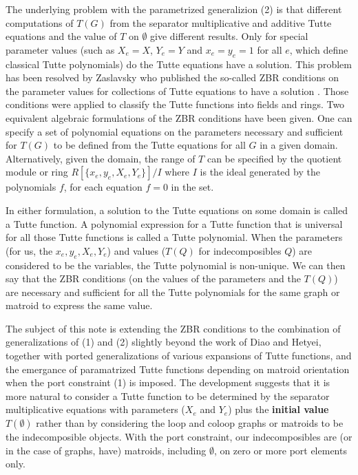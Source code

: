 \documentclass[12pt,leqno]{amsart}
\theoremstyle{remark}
\begin{document}
The underlying problem with the parametrized generalizion (2)
is that different computations of $T(G)$ from the separator
multiplicative and additive Tutte equations and the value of $T$ on $\emptyset$
give different results.  Only for special
parameter values (such as $X_e = X$, $Y_e = Y$ and $x_e = y_e = 1$
for all $e$,
which define classical Tutte polynomials) do the Tutte equations have a
solution.  
This problem has been resolved by Zaslavsky 
who published the so-called ZBR conditions\cite{Ellis-Monaghan-Traldi} 
on the parameter values for collections of Tutte equations to
have a solution 
\cite{MR93a:05047,Ellis-Monaghan-Traldi}.
Those conditions were applied to classify the Tutte functions into
fields\cite{MR93a:05047} and rings\cite{BollobasRiordanTuttePolyColored}.
Two equivalent algebraic formulations 
of the ZBR conditions have been given.  One can specify a set of 
polynomial equations on the 
parameters necessary and sufficient for $T(G)$ to be defined from
the Tutte equations for all $G$ in a given domain.  Alternatively, given the
domain, the range of
$T$ can be specified by the quotient module or ring 
$R[\{x_e, y_e, X_e, Y_e\}]/I$ 
where
$I$ is the ideal generated by the polynomials $f$, for each equation
$f = 0$ in the set.  

In either formulation, a solution to the Tutte equations on some domain
is called a Tutte function.  A polynomial expression for a Tutte function
that is universal for all those Tutte functions is called a Tutte polynomial.
When the parameters (for us, the $x_e, y_e, X_e, Y_e$) and
values ($T(Q)$ for indecomposibles $Q$) are considered to be the variables,
the Tutte polynomial is non-unique\cite{TomJul09}.  We can then
say that the ZBR conditions (on the values of the parameters
and the $T(Q)$) are necessary and sufficient for all the
Tutte polynomials for the same graph or matroid to express the same value.
  
The subject of this note is extending the ZBR conditions
to the combination of generalizations of (1) and (2) slightly
beyond the work of Diao and Hetyei, together with
ported generalizations of various expansions of Tutte functions,
and the emergance of paramatrized Tutte functions depending
on matroid orientation when the port constraint (1) is imposed.
The development suggests that it is more natural to consider
a Tutte function to be determined by the separator multiplicative
equations with parameters ($X_e$ and $Y_e$) 
plus the \textbf{initial value} $T(\emptyset)$
rather than by considering the loop and coloop graphs or matroids
to be the indecomposible objects.  
With the port constraint, our indecomposibles
are (or in the case of graphs, have) matroids, including $\emptyset$,
on zero or more port elements only.
\end{document}
